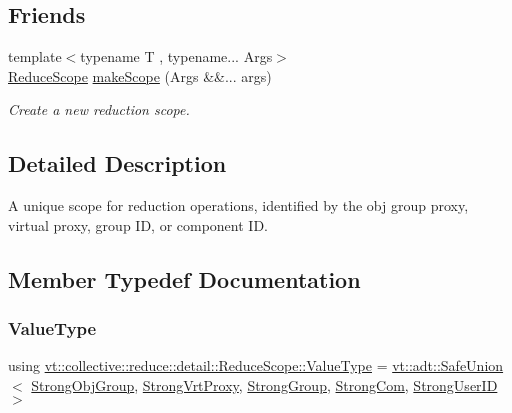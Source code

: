 \subsection*{Friends}
\begin{DoxyCompactItemize}
\item 
{\footnotesize template$<$typename T , typename... Args$>$ }\\\hyperlink{structvt_1_1collective_1_1reduce_1_1detail_1_1_reduce_scope}{Reduce\+Scope} \hyperlink{structvt_1_1collective_1_1reduce_1_1detail_1_1_reduce_scope_affabcae30d44dc7901117edf23a14884}{make\+Scope} (Args \&\&... args)
\begin{DoxyCompactList}\small\item\em Create a new reduction scope. \end{DoxyCompactList}\end{DoxyCompactItemize}


\subsection{Detailed Description}
A unique scope for reduction operations, identified by the obj group proxy, virtual proxy, group ID, or component ID. 

\subsection{Member Typedef Documentation}
\mbox{\label{structvt_1_1collective_1_1reduce_1_1detail_1_1_reduce_scope_a7abcfd8ab86f38734725fe77455e4838}} 
\subsubsection{\texorpdfstring{Value\+Type}{ValueType}}
{\footnotesize\ttfamily using \hyperlink{structvt_1_1collective_1_1reduce_1_1detail_1_1_reduce_scope_a7abcfd8ab86f38734725fe77455e4838}{vt\+::collective\+::reduce\+::detail\+::\+Reduce\+Scope\+::\+Value\+Type} =  \hyperlink{namespacevt_1_1adt_ad2a7bbcb5f4735ae9d847f96ee62f144}{vt\+::adt\+::\+Safe\+Union}$<$ \hyperlink{namespacevt_1_1collective_1_1reduce_1_1detail_afd4940b3a4ac2ef740f0e3844a09dd08}{Strong\+Obj\+Group}, \hyperlink{namespacevt_1_1collective_1_1reduce_1_1detail_a492943cffff6d1a92386468d46f589df}{Strong\+Vrt\+Proxy}, \hyperlink{namespacevt_1_1collective_1_1reduce_1_1detail_adcad97800459415ff6ea4b5feb90e0f2}{Strong\+Group}, \hyperlink{namespacevt_1_1collective_1_1reduce_1_1detail_a6ea2d8e8f8ba226a6e704a9041aebaec}{Strong\+Com}, \hyperlink{namespacevt_1_1collective_1_1reduce_1_1detail_af9e42b20d1be7dccc1b5e587f0387e02}{Strong\+User\+ID} $>$}




